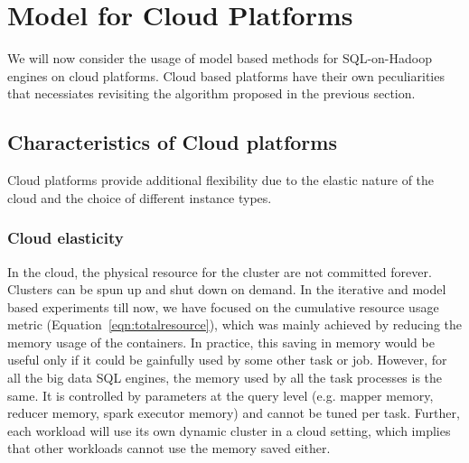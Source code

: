 \section{Model for Cloud Platforms}
\label{sec:modelcloud}
We will now consider the usage of model based methods for SQL-on-Hadoop engines on cloud platforms. Cloud based platforms have their own peculiarities that necessiates revisiting the algorithm proposed in the previous section. 

\subsection{Characteristics of Cloud platforms}
Cloud platforms provide additional flexibility due to the elastic nature of the cloud and the choice of different instance types.

\noindent\subsubsection*{Cloud elasticity}
 In the cloud, the physical resource for the cluster are not committed forever. Clusters can be spun up and shut down on demand. In the iterative and model based experiments till now, we have focused on the cumulative resource usage metric (Equation~\ref{eqn:totalresource}), which was mainly achieved by reducing the memory usage of the containers. 
In practice, this saving in memory would be useful only if it could be gainfully used by some other task or job. However, for all the big data SQL engines, the memory used by all the task processes is the same. It is controlled by parameters at the query level (e.g. mapper memory, reducer memory, spark executor memory) and cannot be tuned per task.
Further, each workload will use its own dynamic cluster in a cloud setting, which implies that other workloads cannot use the memory saved either. 

